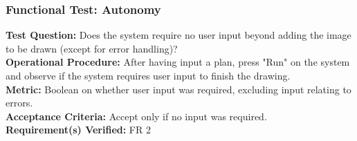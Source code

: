 \subsubsection{Functional Test: Autonomy}
\label{test:sdp_ft_autonomy}
\textbf{Test Question:} Does the system require no user input beyond adding the image to be drawn (except for error handling)? \\
\textbf{Operational Procedure:}  After having input a plan, press "Run" on the system and observe if the system requires user input to finish the drawing. \\
\textbf{Metric:} Boolean on whether user input was required, excluding input relating to errors.\\
\textbf{Acceptance Criteria:} Accept only if no input was required.\\
\textbf{Requirement(s) Verified:} FR 2